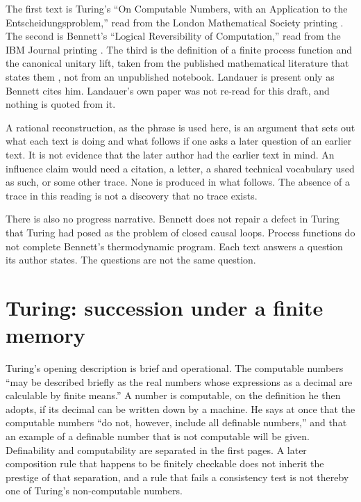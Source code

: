 \documentclass[12pt]{article}
\begin{document}
The first text is Turing's ``On Computable Numbers, with an Application to the Entscheidungsproblem,'' read from the London Mathematical Society printing \citep{turing1936}. The second is Bennett's ``Logical Reversibility of Computation,'' read from the IBM Journal printing \citep{bennett1973}. The third is the definition of a finite process function and the canonical unitary lift, taken from the published mathematical literature that states them \citep{baumeler2016,oreshkov2012,stinespring1955}, not from an unpublished notebook. Landauer is present only as Bennett cites him. Landauer's own paper was not re-read for this draft, and nothing is quoted from it.

A rational reconstruction, as the phrase is used here, is an argument that sets out what each text is doing and what follows if one asks a later question of an earlier text. It is not evidence that the later author had the earlier text in mind. An influence claim would need a citation, a letter, a shared technical vocabulary used as such, or some other trace. None is produced in what follows. The absence of a trace in this reading is not a discovery that no trace exists.

There is also no progress narrative. Bennett does not repair a defect in Turing that Turing had posed as the problem of closed causal loops. Process functions do not complete Bennett's thermodynamic program. Each text answers a question its author states. The questions are not the same question.

\section{Turing: succession under a finite memory}
\label{sec:turing}

Turing's opening description is brief and operational. The computable numbers ``may be described briefly as the real numbers whose expressions as a decimal are calculable by finite means.'' A number is computable, on the definition he then adopts, if its decimal can be written down by a machine. He says at once that the computable numbers ``do not, however, include all definable numbers,'' and that an example of a definable number that is not computable will be given. Definability and computability are separated in the first pages. A later composition rule that happens to be finitely checkable does not inherit the prestige of that separation, and a rule that fails a consistency test is not thereby one of Turing's non-computable numbers.
\end{document}
